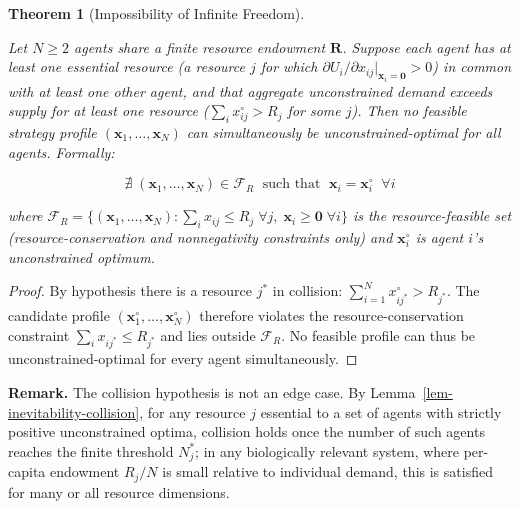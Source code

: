\documentclass[11pt]{article}
\theoremstyle{plain}
\newtheorem{theorem}{Theorem}
\theoremstyle{definition}
\theoremstyle{remark}
\begin{document}
\begin{theorem}[Impossibility of Infinite Freedom]
\label{thm-impossibility-infinite-freedom}

Let $N \geq 2$ agents share a finite resource endowment $\mathbf{R}$. Suppose each agent has at least one essential resource (a resource $j$ for which $\partial U_i / \partial x_{ij} |_{\mathbf{x}_i = \mathbf{0}} > 0$) in common with at least one other agent, and that aggregate unconstrained demand exceeds supply for at least one resource ($\sum_i x_{ij}^{\circ} > R_j$ for some $j$). Then no feasible strategy profile $(\mathbf{x}_1, \ldots, \mathbf{x}_N)$ can simultaneously be unconstrained-optimal for all agents. Formally:

$$\nexists \; (\mathbf{x}_1, \ldots, \mathbf{x}_N) \in \mathcal{F}_R \; \text{ such that } \; \mathbf{x}_i = \mathbf{x}_i^{\circ} \;\; \forall i$$

where $\mathcal{F}_R = \{(\mathbf{x}_1, \ldots, \mathbf{x}_N) : \sum_i x_{ij} \leq R_j \; \forall j, \; \mathbf{x}_i \geq \mathbf{0} \; \forall i\}$ is the resource-feasible set (resource-conservation and nonnegativity constraints only) and $\mathbf{x}_i^{\circ}$ is agent $i$'s unconstrained optimum.
\end{theorem}

\begin{proof}
By hypothesis there is a resource $j^*$ in collision: $\sum_{i=1}^{N} x_{ij^*}^{\circ} > R_{j^*}$. The candidate profile $(\mathbf{x}_1^{\circ}, \ldots, \mathbf{x}_N^{\circ})$ therefore violates the resource-conservation constraint $\sum_i x_{ij^*} \leq R_{j^*}$ and lies outside $\mathcal{F}_R$. No feasible profile can thus be unconstrained-optimal for every agent simultaneously.
\end{proof}

\textbf{Remark.} The collision hypothesis is not an edge case. By
Lemma~\ref{lem-inevitability-collision}, for any resource \(j\)
essential to a set of agents with strictly positive unconstrained
optima, collision holds once the number of such agents reaches the
finite threshold \(N_j^*\); in any biologically relevant system, where
per-capita endowment \(R_j / N\) is small relative to individual demand,
this is satisfied for many or all resource dimensions.
\end{document}
